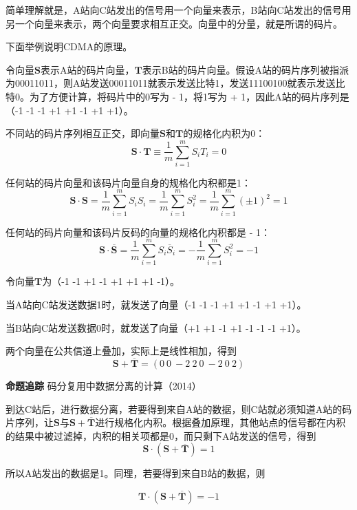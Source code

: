 \documentclass{ctexbook}
\begin{document}
	简单理解就是，A站向C站发出的信号用一个向量来表示，B站向C站发出的信号用另一个向量来表示，两个向量要求相互正交。向量中的分量，就是所谓的码片。
	
	下面举例说明CDMA的原理。
	
	令向量$\boldsymbol{S}$表示A站的码片向量，$\boldsymbol{T}$表示B站的码片向量。假设A站的码片序列被指派为00011011，则A站发送00011011就表示发送比特1，发送11100100就表示发送比特0。为了方便计算，将码片中的0写为 - 1，将1写为 + 1，因此A站的码片序列是（-1 -1 -1 +1 +1 -1 +1 +1）。
	
	不同站的码片序列相互正交，即向量$\boldsymbol{S}$和$\boldsymbol{T}$的规格化内积为0：
	\[
	\boldsymbol{S} \cdot \boldsymbol{T} \equiv \frac{1}{m}\sum_{i = 1}^{m}S_iT_i = 0
	\]
	
	任何站的码片向量和该码片向量自身的规格化内积都是1：
	\[
	\boldsymbol{S} \cdot \boldsymbol{S} = \frac{1}{m}\sum_{i = 1}^{m}S_iS_i = \frac{1}{m}\sum_{i = 1}^{m}S_i^2 = \frac{1}{m}\sum_{i = 1}^{m}(\pm 1)^2 = 1
	\]
	
	任何站的码片向量和该码片反码的向量的规格化内积都是 - 1：
	\[
	\boldsymbol{S} \cdot \overline{\boldsymbol{S}} = \frac{1}{m}\sum_{i = 1}^{m}S_i\overline{S}_i = -\frac{1}{m}\sum_{i = 1}^{m}S_i^2 = -1
	\]
	
	令向量$\boldsymbol{T}$为（-1 -1 +1 -1 +1 +1 +1 -1）。
	
	当A站向C站发送数据1时，就发送了向量（-1 -1 -1 +1 +1 -1 +1 +1）。
	
	当B站向C站发送数据0时，就发送了向量（+1 +1 -1 +1 -1 -1 -1 +1）。
	
	两个向量在公共信道上叠加，实际上是线性相加，得到
	\[
	\boldsymbol{S} + \overline{\boldsymbol{T}} = (0 \ 0 \ -2 \ 2 \ 0 \ -2 \ 0 \ 2)
	\]
	
	\begin{tcolorbox}[colframe=black, colback=white]
		\kaishu \textbf{命题追踪} \quad 码分复用中数据分离的计算（2014）
	\end{tcolorbox}
	
	到达C站后，进行数据分离，若要得到来自A站的数据，则C站就必须知道A站的码片序列，让$\boldsymbol{S}$与$\boldsymbol{S} + \overline{\boldsymbol{T}}$进行规格化内积。根据叠加原理，其他站点的信号都在内积的结果中被过滤掉，内积的相关项都是0，而只剩下A站发送的信号，得到
	\[
	\boldsymbol{S} \cdot (\boldsymbol{S} + \overline{\boldsymbol{T}}) = 1
	\]
	
	所以A站发出的数据是1。同理，若要得到来自B站的数据，则
	
	\[
	\boldsymbol{T} \cdot (\boldsymbol{S} + \overline{\boldsymbol{T}}) = -1
	\]
	
\end{document}
